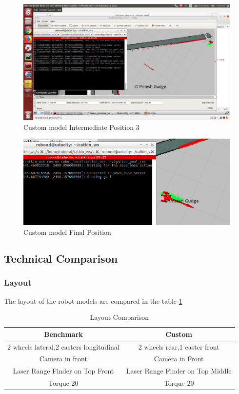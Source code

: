 \documentclass[10pt,journal,compsoc]{IEEEtran}
\begin{document}
\begin{figure}[thpb]
      \centering
      \includegraphics[width=\linewidth]{images/custom4}
      \caption{Custom model Intermediate Position 3}
      \label{fig:customresult3}
\end{figure}
\begin{figure}[thpb]
      \centering
      \includegraphics[width=\linewidth]{images/cropped_custom_goal}
      \caption{Custom model Final Position}
      \label{fig:customresult}
\end{figure}


\subsection{Technical Comparison} %
\subsubsection{Layout}
The layout of the robot models are compared in the table \ref{layoutcomparetable}
\begin{table}[h]
\caption{Layout Comparison}
\label{layoutcomparetable}
\begin{center}
\begin{tabular}{|c|c|}
\hline
Benchmark & Custom \\
\hline
2 wheels lateral,2 casters longitudinal & 2 wheels rear,1 caster front \\
\hline
Camera in front & Camera in Front \\
\hline
Laser Range Finder on Top Front & Laser Range Finder on Top Middle \\
\hline
Torque 20 & Torque 20 \\ 
\hline
\end{tabular}
\end{center}
\end{table}
\end{document}
